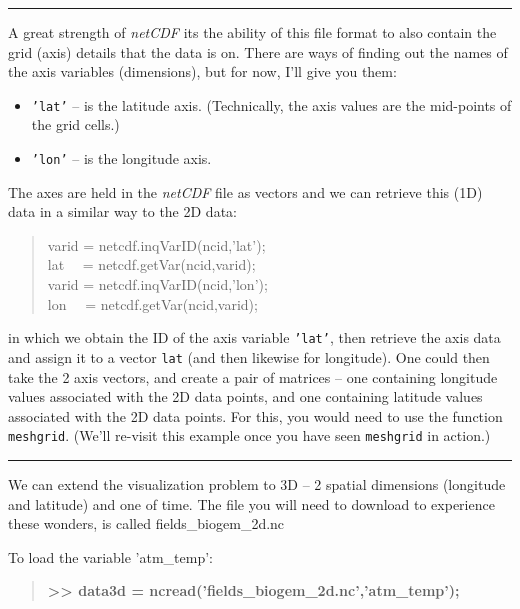 \documentclass{tufte-book} %
\newenvironment{docspec}{\begin{quotation}\ttfamily\parskip0pt\parindent0pt\ignorespaces}{\end{quotation}}
\newenvironment{docspecbold}{\begin{quotation}\ttfamily\bfseries\parskip0pt\parindent0pt\ignorespaces}{\end{quotation}}
\begin{document}
\vspace{1mm}
\noindent\rule{4cm}{0.5pt}
\vspace{2mm}

\noindent A great strength of \textit{netCDF} its the ability of this file format to also contain the grid (axis) details that the data is on. There are ways of finding out the names of the axis variables (dimensions), but for now, I'll give you them:
\begin{itemize}[noitemsep]
\setlength{\itemindent}{.2in}
\item \texttt{'lat'} -- is the latitude axis. (Technically, the axis values are the mid-points of the grid cells.)
\item \texttt{'lon'} -- is the longitude axis.
\end{itemize}

The axes are held in the \textit{netCDF} file as vectors and we can retrieve this (1D) data in a similar way to the 2D data:
\begin{docspec}
varid  = netcdf.inqVarID(ncid,'lat');
\\lat \ \ = netcdf.getVar(ncid,varid);
\\varid  = netcdf.inqVarID(ncid,'lon');
\\lon \ \ = netcdf.getVar(ncid,varid);
\end{docspec}
in which we obtain the ID of the axis variable \texttt{'lat'}, then retrieve the axis data and assign it to a vector \texttt{lat} (and then likewise for longitude). One could then take the 2 axis vectors, and create a pair of matrices -- one containing longitude values associated with the 2D data points, and one containing latitude values  associated with the 2D data points. For this, you would need to use the function \texttt{meshgrid}. (We'll re-visit this example once you have seen \texttt{meshgrid} in action.)

\vspace{1mm}
\noindent\rule{4cm}{0.5pt}
\vspace{2mm}

\newthought{[\textbf{\textcolor{red}{OPTIONAL}}]} We can extend the visualization problem to 3D -- 2 spatial dimensions (longitude and latitude) and one of time. The file you will need to download to experience these wonders, is called \textsf{fields\_biogem\_2d.nc}

To load the variable \textsf{'atm\_temp'}:
\begin{docspecbold}
>> data3d = ncread('fields\_biogem\_2d.nc','atm\_temp');
\end{docspecbold}
\end{document}
